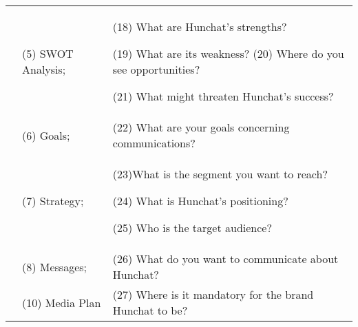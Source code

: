 \documentclass[12pt]{article}
\begin{document}
\begin{table}[htbp]
\begin{tabular}{ @{}P{0.15\textwidth}P{0.2\textwidth}P{0.6\textwidth}@{} }
                            & (5) SWOT Analysis;     & (18) What are Hunchat's strengths?   \par  (19) What are its weakness?  (20) Where do you see opportunities?   \par  (21) What might threaten Hunchat's success?                                                                                                                                                                                                                                 \\
                            & (6) Goals;             & (22) What are your goals concerning communications?                                                                                                                                                                                                                                                                                                                                                                              \\
                            & (7) Strategy;          & (23)What is the segment you want to reach? \par (24) What is Hunchat’s positioning?  \par  (25) Who is the target audience?                                                                                                                                                                                                                                                                      \\
                            & (8) Messages;          & (26) What do you want to communicate about Hunchat?                                                                                                                                                                                                                                                                                                                                                                              \\
                            & (10) Media Plan        & (27) Where is it mandatory for the brand Hunchat to be?                                                                                                                                                                                                                                                                                                                                                                          \\

\end{tabular}
\end{table}
\end{document}
